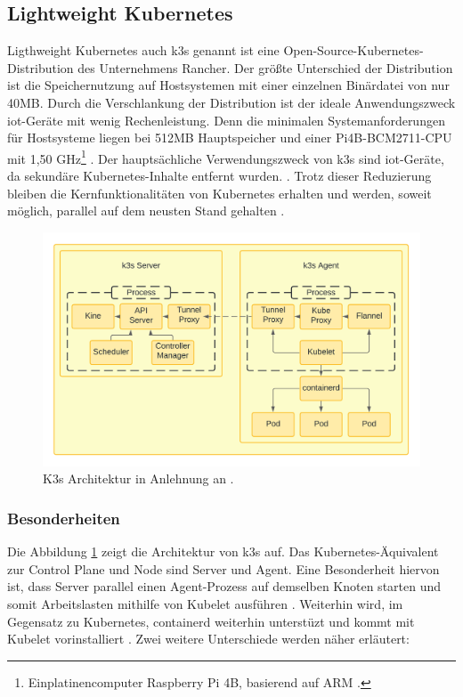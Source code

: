 \subsection{Lightweight Kubernetes} \label{k3s}
Ligthweight Kubernetes auch k3s genannt ist eine Open-Source-Kubernetes-Distributi\-on des Unternehmens
Rancher. Der größte Unterschied der Distribution ist die Speichernutzung 
auf Hostsystemen mit einer einzelnen Binärdatei von nur 40MB.
Durch die Verschlankung der Distribution ist der ideale Anwendungszweck \acs{iot}-Geräte mit wenig Rechenleistung.
Denn die minimalen Systemanforderungen für Hostsysteme liegen bei 512MB Hauptspeicher und einer Pi4B-BCM2711-CPU mit 1,50 GHz\footnote{Einplatinencomputer Raspberry Pi 4B, basierend auf ARM \cite{pi4}.} \cite{k3sAnforderung}.
Der hauptsächliche Verwendungszweck von k3s sind \acs{iot}-Geräte, da sekundäre Kubernetes-Inhalte entfernt wurden. \cite{k3s}.
Trotz dieser Reduzierung bleiben die Kernfunktionalitäten von Kubernetes erhalten und werden, 
soweit möglich, parallel auf dem neusten Stand gehalten \cite{k3sgit}.

\begin{figure}
  \centering
  \includegraphics[width=1.0\columnwidth]{images/K3sArchitektur.png}
  \caption{K3s Architektur in Anlehnung an \cite{k3s}.}
  \label{fig:k3sarchitektur}
\end{figure}

\subsubsection{Besonderheiten}
Die Abbildung \ref{fig:k3sarchitektur} zeigt die Architektur von k3s auf. Das Kubernetes-Äquivalent zur Control Plane und Node
sind Server und Agent. Eine Besonderheit hiervon ist, dass Server parallel einen Agent-Prozess auf demselben Knoten starten und
somit Arbeitslasten mithilfe von Kubelet ausführen \cite{k3sServerAgent}. Weiterhin wird, im Gegensatz zu Kubernetes, containerd weiterhin unterstüzt und
kommt mit Kubelet vorinstalliert \cite{k3s}. Zwei weitere Unterschiede werden näher erläutert:

